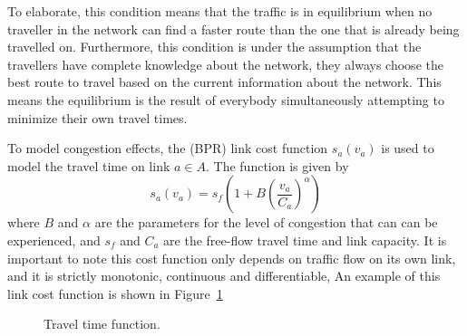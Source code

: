 To elaborate, this condition means that the traffic is in equilibrium when no traveller in the network can find a faster route than the one that is already being travelled on.
Furthermore, this condition is under the assumption that the travellers have complete knowledge about the network,
they always choose the best route to travel based on the current information about the network.
This means the equilibrium is the result of everybody simultaneously attempting to minimize their own travel times.

To model congestion effects,
the \citet{BPR} (BPR) link cost function
$s_a(v_a)$ is used to model the travel time on link $a \in A$.
The function is given by
\begin{equation}
    s_a(v_a) = s_f \left(1 + B \left( \frac{v_a}{C_a} \right)^\alpha \right)
\end{equation}
where $B$ and $\alpha$ are the parameters for the level of congestion that can can be experienced,
and $s_f$ and $C_a$ are the free-flow travel time and link capacity.
It is important to note this cost function only depends on traffic flow on its own link, and it is strictly monotonic, continuous and differentiable,
An example of this link cost function is shown in Figure~\ref{fig:flowfunction}

\begin{figure}[H]
    \centering
    \caption{Travel time function.}
    \label{fig:flowfunction}
\end{figure}

